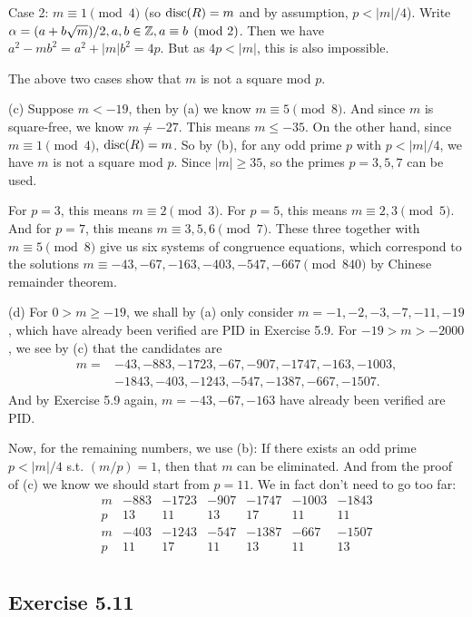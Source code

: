 \documentclass[../Marcus.tex]{subfiles}
\begin{document}
Case 2: $m\equiv1 \pmod{4}$ (so $\operatorname{disc}(R)=m$ and by assumption, $p<|m|/4$). Write $\alpha = (a+b\sqrt{m})/2,a,b\in\mathbb{Z},a \equiv b \pmod{2}$. Then we have $a^2 - mb^2 = a^2 + |m|b^2 = 4p$. But as $4p<|m|$, this is also impossible.

The above two cases show that $m$ is not a square mod $p$.

(c) Suppose $m<-19$, then by (a) we know $m\equiv5 \pmod{8}$. And since $m$ is square-free, we know $m\neq-27$. This means $m\leq-35$. On the other hand, since $m\equiv1 \pmod{4}$, $\operatorname{disc}(R)=m$. So by (b), for any odd prime $p$ with $p<|m|/4$, we have $m$ is not a square mod $p$. Since $|m|\geq35$, so the primes $p=3,5,7$ can be used.

For $p=3$, this means $m \equiv 2 \pmod{3}$. For $p=5$, this means $m \equiv 2,3 \pmod{5}$. And for $p=7$, this means $m \equiv 3,5,6 \pmod{7}$. These three together with $m\equiv5 \pmod{8}$ give us six systems of congruence equations, which correspond to the solutions $m\equiv -43,-67,-163,-403,-547,-667 \pmod{840}$ by Chinese remainder theorem.

(d) For $0>m\geq-19$, we shall by (a) only consider $m=-1,-2,-3,-7,-11,-19$, which have already been verified are PID in Exercise 5.9. For $-19 > m > -2000$, we see by (c) that the candidates are
\begin{align*}
m = &-43,-883,-1723,-67,-907,-1747,-163,-1003,\\
&-1843,-403,-1243,-547,-1387,-667,-1507.
\end{align*}
And by Exercise 5.9 again, $m=-43,-67,-163$ have already been verified are PID.

Now, for the remaining numbers, we use (b): If there exists an odd prime $p<|m|/4$ s.t. $(m/p) = 1$, then that $m$ can be eliminated. And from the proof of (c) we know we should start from $p=11$. We in fact don't need to go too far:
$$
\begin{array}{c|c|c|c|c|c|c}
m&-883&-1723&-907&-1747&-1003&-1843      \\
\hline
p&13&11&13&17&11&11   \\
\hline
m&-403&-1243&-547&-1387&-667&-1507     \\
\hline
p&11&17&11&13&11&13\\
\end{array}
$$

\subsection*{Exercise 5.11}
\end{document}
